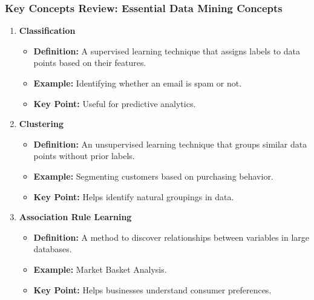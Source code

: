\documentclass[aspectratio=169]{beamer}
\begin{document}
\begin{frame}[fragile]
  \frametitle{Key Concepts Review: Essential Data Mining Concepts}
  \begin{enumerate}
    \item \textbf{Classification}
      \begin{itemize}
        \item \textbf{Definition:} A supervised learning technique that assigns labels to data points based on their features.
        \item \textbf{Example:} Identifying whether an email is spam or not.
        \item \textbf{Key Point:} Useful for predictive analytics.
      \end{itemize}
      
    \item \textbf{Clustering}
      \begin{itemize}
        \item \textbf{Definition:} An unsupervised learning technique that groups similar data points without prior labels.
        \item \textbf{Example:} Segmenting customers based on purchasing behavior.
        \item \textbf{Key Point:} Helps identify natural groupings in data.
      \end{itemize}
      
    \item \textbf{Association Rule Learning}
      \begin{itemize}
        \item \textbf{Definition:} A method to discover relationships between variables in large databases.
        \item \textbf{Example:} Market Basket Analysis.
        \item \textbf{Key Point:} Helps businesses understand consumer preferences.
      \end{itemize}
  \end{enumerate}
\end{frame}
\end{document}
